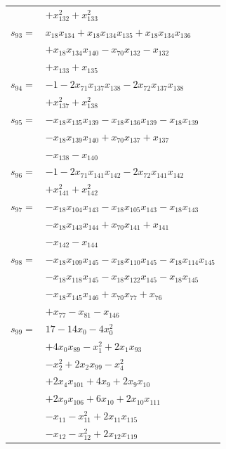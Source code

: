 \begin{longtable}{@{}r@{\;}l@{}}
 & \(\displaystyle +x_{132}^{2} +x_{133}^{2}\) \\[3pt]
\(s_{93}=\) & \(\displaystyle x_{18}x_{134} +x_{18}x_{134}x_{135} +x_{18}x_{134}x_{136}\) \\
 & \(\displaystyle +x_{18}x_{134}x_{140} -x_{70}x_{132} -x_{132}\) \\
 & \(\displaystyle +x_{133} +x_{135}\) \\[3pt]
\(s_{94}=\) & \(\displaystyle -1 -2x_{71}x_{137}x_{138} -2x_{72}x_{137}x_{138}\) \\
 & \(\displaystyle +x_{137}^{2} +x_{138}^{2}\) \\[3pt]
\(s_{95}=\) & \(\displaystyle -x_{18}x_{135}x_{139} -x_{18}x_{136}x_{139} -x_{18}x_{139}\) \\
 & \(\displaystyle -x_{18}x_{139}x_{140} +x_{70}x_{137} +x_{137}\) \\
 & \(\displaystyle -x_{138} -x_{140}\) \\[3pt]
\(s_{96}=\) & \(\displaystyle -1 -2x_{71}x_{141}x_{142} -2x_{72}x_{141}x_{142}\) \\
 & \(\displaystyle +x_{141}^{2} +x_{142}^{2}\) \\[3pt]
\(s_{97}=\) & \(\displaystyle -x_{18}x_{104}x_{143} -x_{18}x_{105}x_{143} -x_{18}x_{143}\) \\
 & \(\displaystyle -x_{18}x_{143}x_{144} +x_{70}x_{141} +x_{141}\) \\
 & \(\displaystyle -x_{142} -x_{144}\) \\[3pt]
\(s_{98}=\) & \(\displaystyle -x_{18}x_{109}x_{145} -x_{18}x_{110}x_{145} -x_{18}x_{114}x_{145}\) \\
 & \(\displaystyle -x_{18}x_{118}x_{145} -x_{18}x_{122}x_{145} -x_{18}x_{145}\) \\
 & \(\displaystyle -x_{18}x_{145}x_{146} +x_{70}x_{77} +x_{76}\) \\
 & \(\displaystyle +x_{77} -x_{81} -x_{146}\) \\[3pt]
\(s_{99}=\) & \(\displaystyle 17 -14x_{0} -4x_{0}^{2}\) \\
 & \(\displaystyle +4x_{0}x_{89} -x_{1}^{2} +2x_{1}x_{93}\) \\
 & \(\displaystyle -x_{2}^{2} +2x_{2}x_{99} -x_{4}^{2}\) \\
 & \(\displaystyle +2x_{4}x_{101} +4x_{9} +2x_{9}x_{10}\) \\
 & \(\displaystyle +2x_{9}x_{106} +6x_{10} +2x_{10}x_{111}\) \\
 & \(\displaystyle -x_{11} -x_{11}^{2} +2x_{11}x_{115}\) \\
 & \(\displaystyle -x_{12} -x_{12}^{2} +2x_{12}x_{119}\) \\

\end{longtable}
